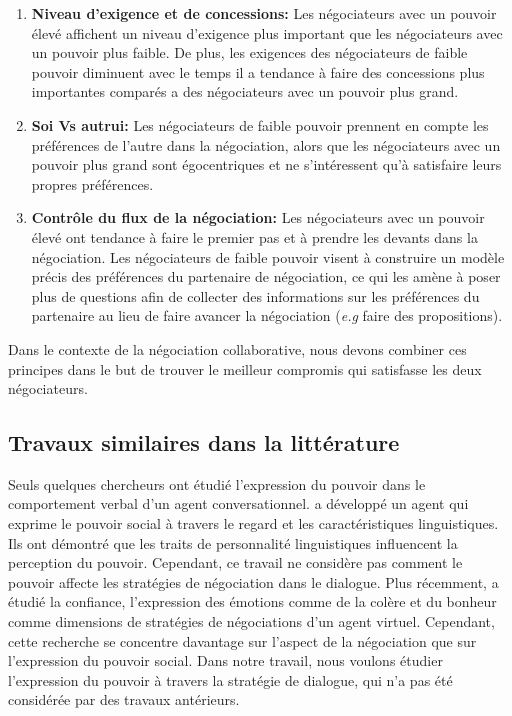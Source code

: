 			\begin{enumerate}
				\item \textbf{Niveau d'exigence et de concessions:} Les négociateurs avec un pouvoir élevé affichent un niveau d'exigence plus important que les négociateurs avec un pouvoir plus faible. De plus, les exigences des négociateurs de faible pouvoir diminuent avec le temps il a tendance à faire des concessions plus importantes comparés a des négociateurs avec un pouvoir plus grand. \cite{de1995impact}
				
				\item \textbf{Soi Vs autrui:} Les négociateurs de faible pouvoir prennent en compte les préférences de l'autre dans la négociation, alors que les négociateurs avec un pouvoir plus grand sont égocentriques et ne s'intéressent qu'à satisfaire leurs propres préférences. \cite{fiske1993controlling,de1995impact}
				
				\item \textbf{Contrôle du flux de la négociation:}
				Les négociateurs avec un pouvoir élevé ont tendance à faire le premier pas \cite {magee2007power} et à prendre les devants dans la négociation. Les négociateurs de faible pouvoir visent à construire un modèle précis des préférences du partenaire de négociation, ce qui les amène à poser plus de questions afin de collecter des informations sur les préférences du partenaire au lieu de faire avancer la négociation (\emph{e.g}  faire des propositions)\cite{de2004influence}. 
				
			\end{enumerate}
	
			Dans le contexte de la négociation collaborative, nous devons combiner ces principes dans le but de trouver le meilleur compromis qui satisfasse les deux négociateurs.
			
		\subsection{Travaux similaires dans la littérature}	
		Seuls quelques chercheurs ont étudié l'expression du pouvoir dans le comportement verbal d'un agent conversationnel. \cite {bee2010bossy} a développé un agent qui exprime le pouvoir social à travers le regard et les caractéristiques linguistiques. Ils ont démontré que les traits de personnalité linguistiques influencent la perception du pouvoir. Cependant, ce travail ne considère pas comment le pouvoir affecte les stratégies de négociation dans le dialogue. Plus récemment, \cite{broekens2010affective, de2015humans} a étudié la confiance, l'expression des émotions comme de la colère et du bonheur comme dimensions de stratégies de négociations d'un agent virtuel. Cependant, cette recherche se concentre davantage sur l'aspect de la négociation que sur l'expression du pouvoir social. Dans notre travail, nous voulons étudier l'expression du pouvoir à travers la stratégie de dialogue, qui n'a pas été considérée par des travaux antérieurs.

